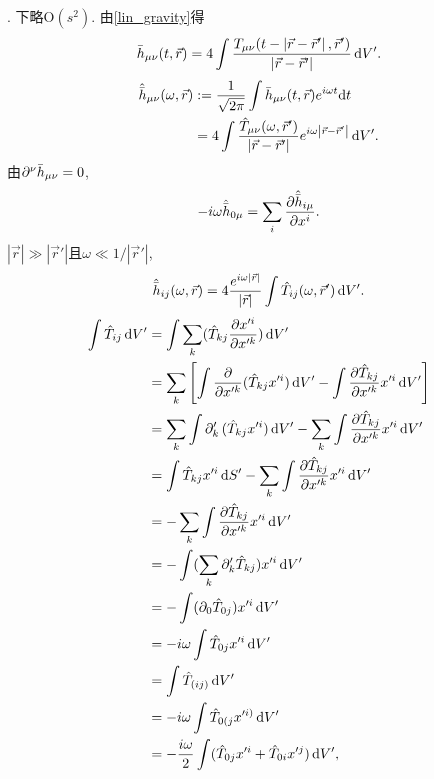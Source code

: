 \cite{Wald1984}. 下略$\text{O}(s^2)$. 由\eqref{lin_gravity}得
\begin{equation}
    \bar{h}_{\mu\nu}(t,\vec{r}) = 4\int 
    \frac{T_{\mu\nu}(t-\left\lvert\vec{r}-\vec{r}'\right\rvert,\vec{r}')}{\left\lvert\vec{r}-\vec{r}'\right\rvert}\,\mathrm{d} V'.
\end{equation}
\begin{align}
    \hat{\bar{h}}_{\mu\nu}(\omega,\vec{r})&:=\frac{1}{\sqrt{2\pi}}
    \int\bar{h}_{\mu\nu}(t,\vec{r})e^{i\omega t}\mathrm{d} t\\
    &=4\int 
    \frac{\hat{T}_{\mu\nu}(\omega,\vec{r}')}{\left\lvert\vec{r}-\vec{r}'\right\rvert}e^{i\omega\left\lvert\vec{r}-\vec{r}'\right\rvert}\,\mathrm{d} V'.
\end{align}
由$\partial^{\nu}\bar{h}_{\mu\nu}=0$,
\begin{equation}
    -i\omega\hat{\bar{h}}_{0\mu}=\sum_{i}\frac{\partial\hat{\bar{h}}_{i\mu}}{\partial x^{i}}.
\end{equation}
$\left\lvert \vec{r}\right\rvert \gg \left\lvert \vec{r}'\right\rvert$且$\omega\ll1/\left\lvert \vec{r}'\right\rvert$,
\begin{equation}
    \hat{\bar{h}}_{ij}(\omega,\vec{r}) = 4
    \frac{e^{i\omega\left\lvert\vec{r}\right\rvert}}{\left\lvert\vec{r}\right\rvert}
    \int \hat{T}_{ij}(\omega,\vec{r}')\,\mathrm{d} V'.
\end{equation}
\begin{align}
    \int \hat{T}_{ij}\,\mathrm{d} V'
    &=\int \sum_{k}(\hat{T}_{kj}\frac{\partial x'^i}{\partial x'^k})\,\mathrm{d} V'\\
    &= \sum_{k}\left[\int \frac{\partial }{\partial x'^k}(\hat{T}_{kj}x'^i)\,\mathrm{d} V'-\int \frac{\partial \hat{T}_{kj}}{\partial x'^k}x'^i\,\mathrm{d} V'\right]\\
    &= \sum_{k}\int \partial'_k\,(\hat{T}_{kj}x'^i)\,\mathrm{d} V' - \sum_{k}\int \frac{\partial \hat{T}_{kj}}{\partial x'^k}x'^i\,\mathrm{d} V'\\
    &= \int \hat{T}_{kj}x'^i\,\mathrm{d} S' - \sum_{k}\int \frac{\partial \hat{T}_{kj}}{\partial x'^k}x'^i\,\mathrm{d} V'\\
    &= -\sum_{k}\int \frac{\partial \hat{T}_{kj}}{\partial x'^k}x'^i\,\mathrm{d} V'\\
    &= -\int (\sum_{k}\partial'_k\hat{T}_{kj})x'^i\,\mathrm{d} V'\\
    &= -\int (\partial_0\hat{T}_{0j})x'^i\,\mathrm{d} V'\\
    &= -i\omega\int \hat{T}_{0j}x'^i\,\mathrm{d} V'\\
    &= \int \hat{T}_{(ij)}\,\mathrm{d} V'\\
    &= -i\omega\int \hat{T}_{0(j}x'^{i)}\,\mathrm{d} V'\\
    &= -\frac{i\omega}{2}\int (\hat{T}_{0j}x'^{i}+\hat{T}_{0i}x'^{j})\,\mathrm{d} V',\\
\end{align}
